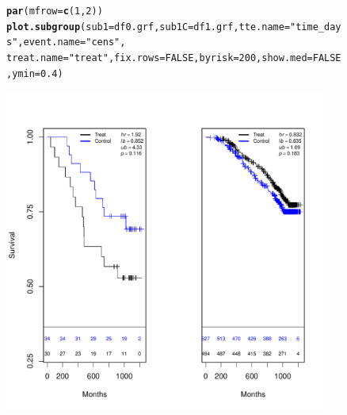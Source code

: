\documentclass[9pt]{article}\usepackage[]{graphicx}\usepackage[]{xcolor}
\makeatletter
\newcommand{\hlnum}[1]{\textcolor[rgb]{0.686,0.059,0.569}{#1}}%
\newcommand{\hlstr}[1]{\textcolor[rgb]{0.192,0.494,0.8}{#1}}%
\newcommand{\hlstd}[1]{\textcolor[rgb]{0.345,0.345,0.345}{#1}}%
\newcommand{\hlkwc}[1]{\textcolor[rgb]{0.333,0.667,0.333}{#1}}%
\newcommand{\hlkwd}[1]{\textcolor[rgb]{0.737,0.353,0.396}{\textbf{#1}}}%
\newenvironment{kframe}{%
 \def\at@end@of@kframe{}%
 \ifinner\ifhmode%
  \def\at@end@of@kframe{\end{minipage}}%
  \begin{minipage}{\columnwidth}%
 \fi\fi%
 \def\FrameCommand##1{\hskip\@totalleftmargin \hskip-\fboxsep
 \colorbox{shadecolor}{##1}\hskip-\fboxsep
     \hskip-\linewidth \hskip-\@totalleftmargin \hskip\columnwidth}%
 \MakeFramed {\advance\hsize-\width
   \@totalleftmargin\z@ \linewidth\hsize
   \@setminipage}}%
 {\par\unskip\endMakeFramed%
 \at@end@of@kframe}
\newenvironment{knitrout}{}{} %
\theoremstyle{definition}
\theoremstyle{remark}
\makeatother
\begin{document}

\begin{figure}[h!]
\begin{center}
\begin{knitrout}
\color{fgcolor}\begin{kframe}
\begin{alltt}
\hlkwd{par}\hlstd{(}\hlkwc{mfrow} \hlstd{=} \hlkwd{c}\hlstd{(}\hlnum{1}\hlstd{,} \hlnum{2}\hlstd{))}
\hlkwd{plot.subgroup}\hlstd{(}\hlkwc{sub1} \hlstd{= df0.grf,} \hlkwc{sub1C} \hlstd{= df1.grf,} \hlkwc{tte.name} \hlstd{=} \hlstr{"time_days"}\hlstd{,} \hlkwc{event.name} \hlstd{=} \hlstr{"cens"}\hlstd{,}
    \hlkwc{treat.name} \hlstd{=} \hlstr{"treat"}\hlstd{,} \hlkwc{fix.rows} \hlstd{=} \hlnum{FALSE}\hlstd{,} \hlkwc{byrisk} \hlstd{=} \hlnum{200}\hlstd{,} \hlkwc{show.med} \hlstd{=} \hlnum{FALSE}\hlstd{,} \hlkwc{ymin} \hlstd{=} \hlnum{0.4}\hlstd{)}
\end{alltt}
\end{kframe}
\includegraphics[width=400px,height=400px]{figure/grf_sg_2v3-1} 
\end{knitrout}
\end{center}
\end{figure}
\end{document}
